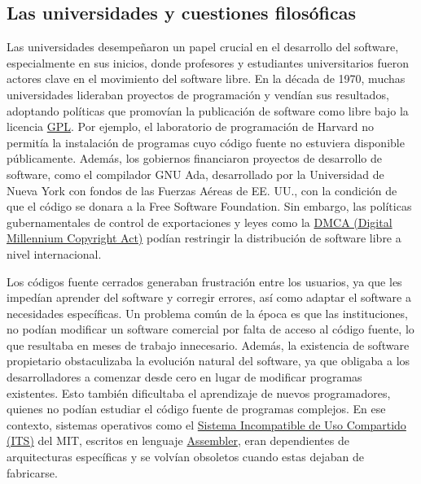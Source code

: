 \documentclass[a4paper,12pt]{article}
\begin{document}
\subsection{Las universidades y cuestiones filosóficas}
Las universidades desempeñaron un papel crucial en el desarrollo del software,
especialmente en sus inicios, donde profesores y estudiantes universitarios
fueron actores clave en el movimiento del software libre. En la década de 1970,
muchas universidades lideraban proyectos de programación y vendían sus
resultados, adoptando políticas que promovían la publicación de software como
libre bajo la licencia \hyperref[gpl]{GPL}. Por ejemplo, el laboratorio de programación de
Harvard no permitía la instalación de programas cuyo código fuente no estuviera
disponible públicamente. Además, los gobiernos financiaron proyectos de
desarrollo de software, como el compilador GNU Ada, desarrollado por la
Universidad de Nueva York con fondos de las Fuerzas Aéreas de EE. UU., con la
condición de que el código se donara a la Free Software Foundation. Sin embargo,
las políticas gubernamentales de control de exportaciones y leyes como la \hyperref[dmca]{DMCA
(Digital Millennium Copyright Act)} podían restringir la distribución de software
libre a nivel internacional.

Los códigos fuente cerrados generaban frustración entre los usuarios, ya que les
impedían aprender del software y corregir errores, así como adaptar el software
a necesidades específicas. Un problema común de la época es que las instituciones,
no podían modificar un software comercial por falta de acceso al código fuente,
lo que resultaba en meses de trabajo innecesario. Además, la existencia de
software propietario obstaculizaba la evolución natural del software, ya que
obligaba a los desarrolladores a comenzar desde cero en lugar de modificar
programas existentes. Esto también dificultaba el aprendizaje de nuevos
programadores, quienes no podían estudiar el código fuente de programas
complejos. En ese contexto, sistemas operativos como el \hyperref[its]{Sistema Incompatible de
Uso Compartido (ITS)} del MIT, escritos en lenguaje \hyperref[assembler]{Assembler}, eran dependientes
de arquitecturas específicas y se volvían obsoletos cuando estas dejaban de
fabricarse. 
\end{document}
